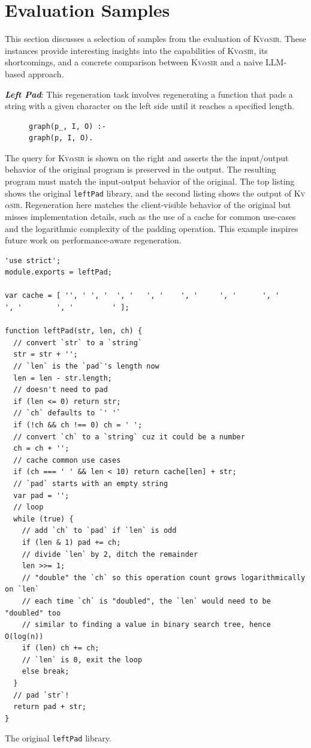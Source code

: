 \documentclass[nonacm,sigplan,review]{acmart}
\newcommand{\sys}{{\scshape Kv{$\alpha$}sir}\xspace}
\newcommand{\heading}[1]{\vspace{2pt}\noindent\textbf{\emph{#1}}:\enspace}
\newcommand{\ttt}[1]{\texttt{#1}\xspace}
\begin{document}



\appendix

\section{Evaluation Samples}
\label{sec:eval-samples}
This section discusses a selection of samples from the evaluation of \sys.
These instances provide interesting insights into the capabilities of \sys, its shortcomings,
and a concrete comparison between \sys and a naive LLM-based approach.

\heading{Left Pad}
This regeneration task involves regenerating a
function that pads a string with a given character on the left side until it
reaches a specified length.

\begin{figure}
\begin{verbatim}
graph(p_, I, O) :-
graph(p, I, O).
\end{verbatim}
\end{figure}
The query for \sys is shown on the right and asserts the the input/output behavior of the
original program is preserved in the output.
The resulting program must match the input-output behavior of the original.
The top listing shows the original \ttt{leftPad} library, and the second listing shows the output
of \sys.
Regeneration here matches the client-visible behavior of the original but misses
implementation details, such as the use of a cache for common
use-cases and the logarithmic complexity of the padding operation.
This example inspires future work on performance-aware regeneration.

\begin{listing}[htpb]
\begin{verbatim}
'use strict';
module.exports = leftPad;

var cache = [ '', ' ', '  ', '   ', '    ', '     ', '      ', '       ', '        ', '         ' ];

function leftPad(str, len, ch) {
  // convert `str` to a `string`
  str = str + '';
  // `len` is the `pad`'s length now
  len = len - str.length;
  // doesn't need to pad
  if (len <= 0) return str;
  // `ch` defaults to `' '`
  if (!ch && ch !== 0) ch = ' ';
  // convert `ch` to a `string` cuz it could be a number
  ch = ch + '';
  // cache common use cases
  if (ch === ' ' && len < 10) return cache[len] + str;
  // `pad` starts with an empty string
  var pad = '';
  // loop
  while (true) {
    // add `ch` to `pad` if `len` is odd
    if (len & 1) pad += ch;
    // divide `len` by 2, ditch the remainder
    len >>= 1;
    // "double" the `ch` so this operation count grows logarithmically on `len`
    // each time `ch` is "doubled", the `len` would need to be "doubled" too
    // similar to finding a value in binary search tree, hence O(log(n))
    if (len) ch += ch;
    // `len` is 0, exit the loop
    else break;
  }
  // pad `str`!
  return pad + str;
}
  \end{verbatim}
\caption{The original \ttt{leftPad} library.}
\end{listing}
\end{document}
